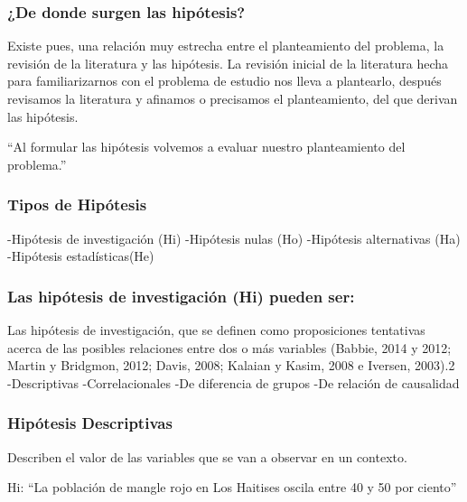 \documentclass{beamer}
\begin{document}
		\begin{frame}
			\frametitle{¿De donde surgen las hipótesis?}
			\begin{definition}
			Existe pues, una relación muy estrecha entre el planteamiento del problema, la revisión de la literatura y las hipótesis. La revisión inicial de la literatura hecha para familiarizarnos con el problema de estudio nos lleva a plantearlo, después revisamos la literatura y afinamos o precisamos el planteamiento, del que derivan las  hipótesis. 
			
			“Al formular las hipótesis volvemos a evaluar nuestro planteamiento del   problema.”
			\end{definition}
		\end{frame}
		\begin{frame}
			\frametitle{Tipos de Hipótesis}
			\begin{definition}
				-Hipótesis de investigación (Hi)
				\linebreak-Hipótesis nulas (Ho)
				\linebreak-Hipótesis alternativas (Ha)
				\linebreak-Hipótesis estadísticas(He)	
			\end{definition}
		
		\end{frame}
			\begin{frame}
				\frametitle{Las hipótesis de investigación (Hi) pueden ser:}
				\begin{definition}
				  Las hipótesis de investigación, que se definen como proposiciones tentativas acerca de
					las posibles relaciones entre dos o más variables (Babbie, 2014 y 2012; Martin y
					Bridgmon, 2012; Davis, 2008; Kalaian y Kasim, 2008 e Iversen, 2003).{2}
					\linebreak-Descriptivas
					\linebreak-Correlacionales
					\linebreak-De diferencia de grupos
					\linebreak-De relación de causalidad
					
				\end{definition}
			
			\end{frame}
				\begin{frame}
					\frametitle{Hipótesis Descriptivas}
					\begin{definition}
						Describen el valor de las variables que se van a observar en un contexto.
						
					\end{definition}
					\begin{example}
						Hi: “La población de mangle rojo en Los Haitises oscila entre 40 y 50 por ciento”
						
					\end{example}
				\end{frame}
\end{document}
